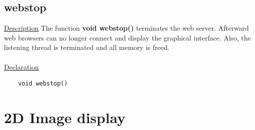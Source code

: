 \subsection{webstop}
\underline{Description} The function \textbf{void webstop()} terminates the web server. Afterward web browsers can no longer
connect and display the graphical interface. Also, the listening thread is terminated and all memory is freed.\\
\\
\underline{Declaration} 
\begin{verbatim} 
	void webstop()
\end{verbatim}


\newpage
\section{2D Image display}
\label{sec:2-3}
